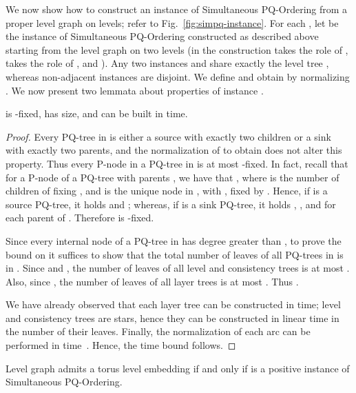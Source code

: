 \documentclass{llncs}
\begin{document}
We now show how to construct an instance  of {\sc Simultaneous PQ-Ordering} from a proper level graph  on  levels; refer to Fig.~\ref{fig:simpq-instance}. For each , let  be the instance of {\sc
  Simultaneous PQ-Ordering} constructed as described above starting from the level graph on two levels  (in the construction  takes the role of ,  takes the role of , and  ). Any two instances  and  share exactly the level tree , whereas non-adjacent instances are disjoint. We define  and obtain  by normalizing .  We now present two lemmata about properties of instance . 

\begin{lemma} \label{le:construction}
 is -fixed, has  size, and can be built in  time. 
\end{lemma} 

\begin{proof}
  Every PQ-tree  in  is either a source with exactly two children or a sink with exactly two parents, and the normalization of  to obtain  does not alter this property. Thus every P-node in a PQ-tree  in  is at most -fixed.
  In fact, recall that for a P-node  of a PQ-tree  with parents , we have that , where  is the number
of children of  fixing , and   is the unique node in , with , fixed by . Hence, if  is a source PQ-tree, it holds  and ; whereas, if  is a sink PQ-tree, it holds , , and  for each parent  of . Therefore  is -fixed.

Since every internal node of a PQ-tree in  has degree greater than , to prove the bound on  it suffices to show that the total number of leaves of all PQ-trees in  is in . Since  and , the number of leaves of all level and consistency trees is at most . Also, since , the number of leaves of all layer trees is at most . Thus .

We have already observed that each layer tree  can be constructed in  time; level and consistency trees are stars, hence they can be constructed in linear time in the number of their leaves. Finally, the normalization of each arc  can be performed in  time~\cite{br-spacep-13}. Hence, the  time bound follows.  
\end{proof}

\begin{lemma} \label{le:reduction}
Level graph  admits a torus level embedding if and only if  is a positive instance of {\sc Simultaneous PQ-Ordering}.
\end{lemma}
\end{document}
